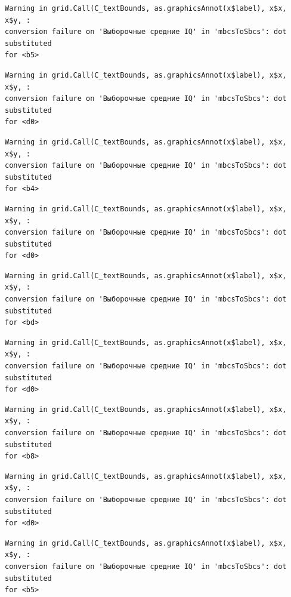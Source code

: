\documentclass[
  letterpaper,
  DIV=11,
  numbers=noendperiod]{scrreprt}
\theoremstyle{definition}
\theoremstyle{remark}
\begin{document}
\begin{verbatim}
Warning in grid.Call(C_textBounds, as.graphicsAnnot(x$label), x$x, x$y, :
conversion failure on 'Выборочные средние IQ' in 'mbcsToSbcs': dot substituted
for <b5>
\end{verbatim}

\begin{verbatim}
Warning in grid.Call(C_textBounds, as.graphicsAnnot(x$label), x$x, x$y, :
conversion failure on 'Выборочные средние IQ' in 'mbcsToSbcs': dot substituted
for <d0>
\end{verbatim}

\begin{verbatim}
Warning in grid.Call(C_textBounds, as.graphicsAnnot(x$label), x$x, x$y, :
conversion failure on 'Выборочные средние IQ' in 'mbcsToSbcs': dot substituted
for <b4>
\end{verbatim}

\begin{verbatim}
Warning in grid.Call(C_textBounds, as.graphicsAnnot(x$label), x$x, x$y, :
conversion failure on 'Выборочные средние IQ' in 'mbcsToSbcs': dot substituted
for <d0>
\end{verbatim}

\begin{verbatim}
Warning in grid.Call(C_textBounds, as.graphicsAnnot(x$label), x$x, x$y, :
conversion failure on 'Выборочные средние IQ' in 'mbcsToSbcs': dot substituted
for <bd>
\end{verbatim}

\begin{verbatim}
Warning in grid.Call(C_textBounds, as.graphicsAnnot(x$label), x$x, x$y, :
conversion failure on 'Выборочные средние IQ' in 'mbcsToSbcs': dot substituted
for <d0>
\end{verbatim}

\begin{verbatim}
Warning in grid.Call(C_textBounds, as.graphicsAnnot(x$label), x$x, x$y, :
conversion failure on 'Выборочные средние IQ' in 'mbcsToSbcs': dot substituted
for <b8>
\end{verbatim}

\begin{verbatim}
Warning in grid.Call(C_textBounds, as.graphicsAnnot(x$label), x$x, x$y, :
conversion failure on 'Выборочные средние IQ' in 'mbcsToSbcs': dot substituted
for <d0>
\end{verbatim}

\begin{verbatim}
Warning in grid.Call(C_textBounds, as.graphicsAnnot(x$label), x$x, x$y, :
conversion failure on 'Выборочные средние IQ' in 'mbcsToSbcs': dot substituted
for <b5>
\end{verbatim}
\end{document}
